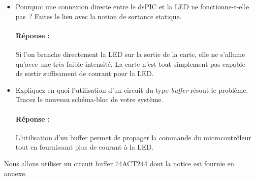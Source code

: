 \documentclass[11pt,a4paper]{article}
\theoremstyle{definition}%
\newcommand{\reponse}[1]{%
	\ifthenelse {\boolean{corrige}} {\paragraph{Réponse :} \color{darkblue}   #1\color{black}} {}
 }
\begin{document}



\begin{itemize}
	\item Pourquoi une connexion directe entre le dsPIC et la LED ne fonctionne-t-elle pas~?
	Faites le lien avec la notion de sortance statique.
	\reponse{
		Si l'on branche directement la LED sur la sortie de la carte, elle ne s'allume qu'avec une très faible intensité.
		La carte n'est tout simplement pas capable de sortir suffisament de courant pour la LED.
	}
	\item Expliquez en quoi l’utilisation d’un circuit du type \textit{buffer} résout le problème.
	Tracez le nouveau schéma-bloc de votre système.
	\reponse{
		L'utilisation d'un buffer permet de propager la commande du microcontrôleur tout en fournissant plus de courant à la LED.
	}
\end{itemize}

Nous allons utiliser un circuit buffer 74ACT244 dont la notice est fournie en annexe.
\end{document}
